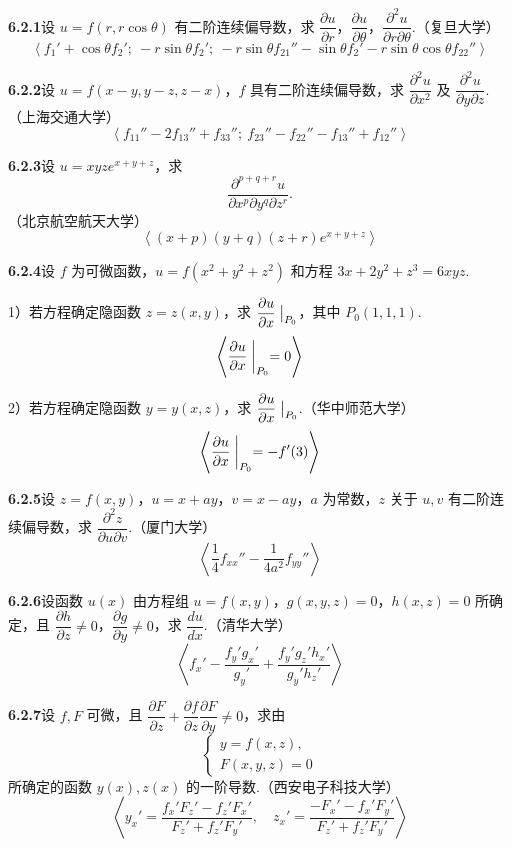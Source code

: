 \documentclass[UTF8, 12pt, fontset=fandol, oneside]{ctexart}
\begin{document}
\noindent\textbf{6.2.1}\quad 设 $u=f(r,r\cos\theta)$ 有二阶连续偏导数，求 $\dfrac{\partial u}{\partial r}$，$\dfrac{\partial u}{\partial\theta}$，$\dfrac{\partial^2u}{\partial r\partial\theta}$.（复旦大学）
\[
  \left\langle f_1'+\cos\theta f_2';\ -r\sin\theta f_2';\
  -r\sin\theta f_{21}''-\sin\theta f_2'-r\sin\theta\cos\theta f_{22}''\right\rangle
\]

\noindent\textbf{6.2.2}\quad 设 $u=f(x-y,y-z,z-x)$，$f$ 具有二阶连续偏导数，求 $\dfrac{\partial^2u}{\partial x^2}$ 及 $\dfrac{\partial^2u}{\partial y\partial z}$.（上海交通大学）
\[
  \left\langle f_{11}''-2f_{13}''+f_{33}'';\
  f_{23}''-f_{22}''-f_{13}''+f_{12}''\right\rangle
\]

\noindent\textbf{6.2.3}\quad 设 $u=xyze^{x+y+z}$，求
\[
  \frac{\partial^{p+q+r}u}{\partial x^p\partial y^q\partial z^r}.
\]
（北京航空航天大学）
\[
  \left\langle (x+p)(y+q)(z+r)e^{x+y+z}\right\rangle
\]

\noindent\textbf{6.2.4}\quad 设 $f$ 为可微函数，$u=f(x^2+y^2+z^2)$ 和方程 $3x+2y^2+z^3=6xyz$.

1）若方程确定隐函数 $z=z(x,y)$，求 $\dfrac{\partial u}{\partial x}\bigm|_{P_0}$，其中 $P_0(1,1,1)$.
\[
  \left\langle \frac{\partial u}{\partial x}\biggm|_{P_0}=0\right\rangle
\]

2）若方程确定隐函数 $y=y(x,z)$，求 $\dfrac{\partial u}{\partial x}\bigm|_{P_0}$.（华中师范大学）
\[
  \left\langle \frac{\partial u}{\partial x}\biggm|_{P_0}=-f'(3)\right\rangle
\]

\noindent\textbf{6.2.5}\quad 设 $z=f(x,y)$，$u=x+ay$，$v=x-ay$，$a$ 为常数，$z$ 关于 $u,v$ 有二阶连续偏导数，求 $\dfrac{\partial^2z}{\partial u\partial v}$.（厦门大学）
\[
  \left\langle \frac14f_{xx}''-\frac1{4a^2}f_{yy}''\right\rangle
\]

\noindent\textbf{6.2.6}\quad 设函数 $u(x)$ 由方程组 $u=f(x,y)$，$g(x,y,z)=0$，$h(x,z)=0$ 所确定，且 $\dfrac{\partial h}{\partial z}\ne0$，$\dfrac{\partial g}{\partial y}\ne0$，求 $\dfrac{du}{dx}$.（清华大学）
\[
  \left\langle f_x'-\frac{f_y'g_x'}{g_y'}+\frac{f_y'g_z'h_x'}{g_y'h_z'}\right\rangle
\]

\noindent\textbf{6.2.7}\quad 设 $f,F$ 可微，且 $\dfrac{\partial F}{\partial z}+\dfrac{\partial f}{\partial z}\dfrac{\partial F}{\partial y}\ne0$，求由
\[
  \begin{cases}
  y=f(x,z),\\
  F(x,y,z)=0
  \end{cases}
\]
所确定的函数 $y(x),z(x)$ 的一阶导数.（西安电子科技大学）
\[
  \left\langle
  y_x'=\frac{f_x'F_z'-f_z'F_x'}{F_z'+f_z'F_y'},\quad
  z_x'=\frac{-F_x'-f_x'F_y'}{F_z'+f_z'F_y'}
  \right\rangle
\]
\end{document}
